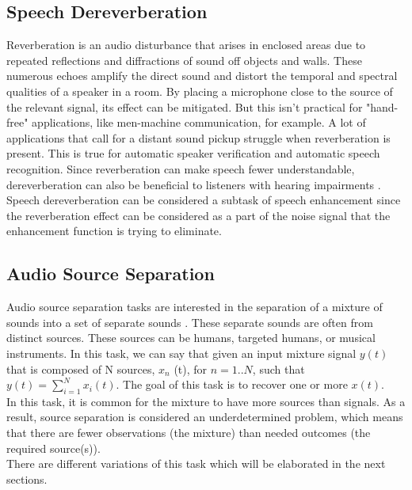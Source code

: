 \subsection{Speech Dereverberation}
Reverberation is an audio disturbance that arises in enclosed areas due to repeated reflections and diffractions of sound off objects and walls. These numerous echoes amplify the direct sound and distort the temporal and spectral qualities of a speaker in a room. By placing a microphone close to the source of the relevant signal, its effect can be mitigated. But this isn't practical for "hand-free" applications, like men-machine communication, for example. A lot of applications that call for a distant sound pickup struggle when reverberation is present. This is true for automatic speaker verification and automatic speech recognition. Since reverberation can make speech fewer understandable, dereverberation can also be beneficial to listeners with hearing impairments \cite{lebart2001}.
Speech dereverberation can be considered a subtask of speech enhancement since the reverberation effect can be considered as a part of the noise signal that the enhancement function is trying to eliminate.

\subsection{Audio Source Separation}
Audio source separation tasks are interested in the separation of a mixture of sounds into a set of separate sounds \cite{vincent2018}. These separate sounds are often from distinct sources. These sources can be humans, targeted humans, or musical instruments.
In this task, we can say that given an input mixture signal $y(t)$ that is composed of N sources, $x_n$ (t), for $n=1..N$, such that $y(t) = \sum_{i=1}^{N} x_i(t)$. The goal of this task is to recover one or more $x(t)$.\\
In this task, it is common for the mixture to have more sources than signals. As a result, source separation is considered an underdetermined problem, which means that there are fewer observations (the mixture) than needed outcomes (the required source(s)).\\
There are different variations of this task which will be elaborated in the next sections.

